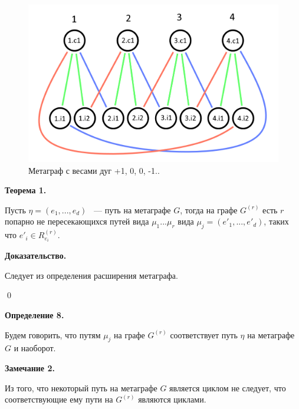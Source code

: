 \documentclass[14pt]{mmcs-article}
\begin{document}
\begin{figure}[H]
    \centering
    \includegraphics[scale=0.4]{Fig_1.png}
    \caption{ Метаграф с весами дуг +1, 0, 0, -1.. }
    \label{image:3.g}
\end{figure}

\textbf{Теорема 1.}



Пусть $\eta = (e_1, ..., e_d)$ ~--- путь на метаграфе $G$, тогда на графе $G^{(r)}$ есть $r$ попарно не пересекающихся путей вида $\mu_1 ... \mu_r$ вида $\mu_j = (e'_1, ..., e'_d)$, таких что $e'_i \in R^{(r)}_{e_i}$.

\textbf{Доказательство.}


Следует из определения расширения метаграфа.

\qed

\textbf{Определение 8.}

Будем говорить, что путям $\mu_j$ на графе $G^{(r)}$ соответствует путь $\eta$ на метаграфе $G$ и наоборот.

\textbf{Замечание 2.}

Из того, что некоторый путь на метаграфе $G$ является циклом не следует, что соответствующие ему пути на $G^{(r)}$ являются циклами.
\end{document}
